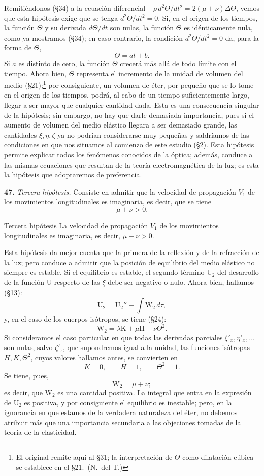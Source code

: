 Remitiéndonos (§34) a la ecuación diferencial
$-\rho\,d^2\Theta/dt^2=2(\mu+\nu)\Delta\Theta$, vemos que esta hipótesis
exige que se tenga $d^2\Theta/dt^2=0$. Si, en el origen de los tiempos, la
función $\Theta$ y su derivada $d\Theta/dt$ son nulas, la función $\Theta$
es idénticamente nula, como ya mostramos (§34); en caso contrario, la
condición $d^2\Theta/dt^2=0$ da, para la forma de $\Theta$,
\[
\Theta = at+b.
\]
Si $a$ es distinto de cero, la función $\Theta$ crecerá más allá de todo
límite con el tiempo. Ahora bien, $\Theta$ representa el incremento de la
unidad de volumen del medio (§21);\footnote{El original remite aquí al
§31; la interpretación de $\Theta$ como dilatación cúbica se establece en
el §21.~(N.~del T.)} por consiguiente, un volumen de éter,
por pequeño que se lo tome en el origen de los tiempos, podrá, al cabo de
un tiempo suficientemente largo, llegar a ser mayor que cualquier cantidad
dada. Esta es una consecuencia singular de la hipótesis; sin embargo, no
hay que darle demasiada importancia, pues si el aumento de volumen del
medio elástico llegara a ser demasiado grande, las cantidades
$\xi,\eta,\zeta$ ya no podrían considerarse muy pequeñas y saldríamos de
las condiciones en que nos situamos al comienzo de este estudio (§2).
Esta hipótesis permite explicar todos los fenómenos conocidos de la
óptica; además, conduce a las mismas ecuaciones que resultan de la teoría
electromagnética de la luz; es esta la hipótesis que adoptaremos de
preferencia.

\noindent\textbf{47.} \emph{Tercera hipótesis.} Consiste en admitir que
la velocidad de propagación $V_1$ de los movimientos longitudinales es
imaginaria, es decir, que se tiene
\[
\mu+\nu>0.
\]

\begin{enunciado}{Tercera hipótesis}
La velocidad de propagación $V_1$ de los movimientos longitudinales es
imaginaria, es decir, $\mu+\nu>0$.
\end{enunciado}

Esta hipótesis da mejor cuenta que la primera de la reflexión y de la
refracción de la luz; pero conduce a admitir que la posición de
equilibrio del medio elástico no siempre es estable. Si el equilibrio es
estable, el segundo término $\mathrm{U}_2$ del desarrollo de la función $\mathrm{U}$
respecto de las $\xi$ debe ser negativo o nulo. Ahora bien, hallamos
(§13):
\[
\mathrm{U}_2 = \mathrm{U}_2'' + \int \mathrm{W}_2\,d\tau,
\]
y, en el caso de los cuerpos isótropos, se tiene (§24):
\[
\mathrm{W}_2 = \lambda\mathrm{K}+\mu\mathrm{H} + \nu\Theta^2.
\]
Si consideramos el caso particular en que todas las derivadas parciales
$\xi'_x,\eta'_x,\dots$ son nulas, salvo $\zeta'_z$, que supondremos igual
a la unidad, las funciones isótropas $H,K,\Theta^2$, cuyos valores
hallamos antes, se convierten en
\[
K=0,\qquad H=1,\qquad \Theta^2=1.
\]
Se tiene, pues,
\[
\mathrm{W}_2 = \mu+\nu;
\]
es decir, que $\mathrm{W}_2$ es una cantidad positiva. La integral que entra en la
expresión de $\mathrm{U}_2$ es positiva, y por consiguiente el equilibrio es
inestable; pero, en la ignorancia en que estamos de la verdadera
naturaleza del éter, no debemos atribuir más que una importancia
secundaria a las objeciones tomadas de la teoría de la elasticidad.


